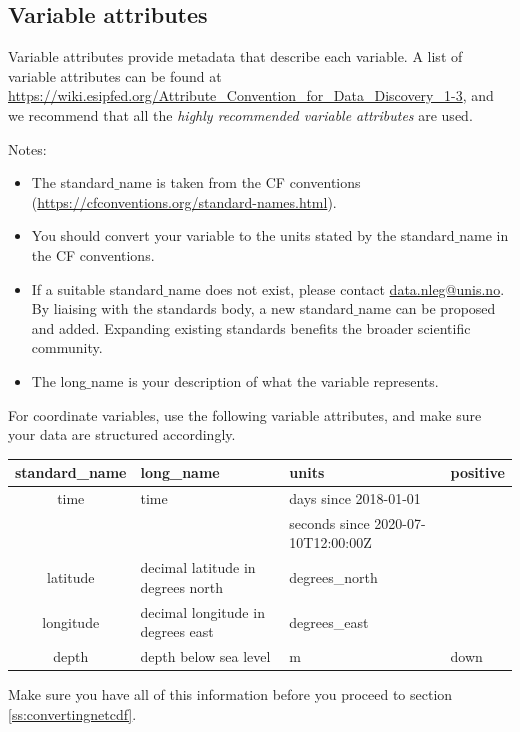 \documentclass[a4paper,english, 11pt]{article}
\makeatletter
\newcommand{\emailme}{\href{mailto:data.nleg@unis.no}{data.nleg@unis.no}}
\makeatother
\begin{document}
\subsection{Variable attributes}
\label{ss:variableattributes}

Variable attributes provide metadata that describe each variable. A list of variable attributes can be found at \url{https://wiki.esipfed.org/Attribute_Convention_for_Data_Discovery_1-3}, and we recommend that all the \textit{highly recommended variable attributes} are used.

Notes:
\begin{itemize}
\item The standard$\_$name is taken from the CF conventions (\url{https://cfconventions.org/standard-names.html}). 
\item You should convert your variable to the units stated by the standard$\_$name in the CF conventions.
\item If a suitable standard$\_$name does not exist, please contact \emailme . By liaising with the standards body, a new standard$\_$name can be proposed and added. Expanding existing standards benefits the broader scientific community.
\item The long$\_$name is your description of what the variable represents.  
\end{itemize}

For coordinate variables, use the following variable attributes, and make sure your data are structured accordingly.

\begin{center}
\begin{tabular}{ |c|p{}|p{}|p{}| } 
\hline
standard\_name & long\_name & units & positive \\
\hline
time & time & days since 2018-01-01 & \\
& & seconds since 2020-07-10T12:00:00Z & \\ 
latitude & decimal latitude in degrees north & degrees\_north & \\
longitude & decimal longitude in degrees east & degrees\_east & \\
depth & depth below sea level & m & down \\
\hline
\end{tabular}
\end{center}

Make sure you have all of this information before you proceed to section \ref{ss:convertingnetcdf}.
\end{document}
